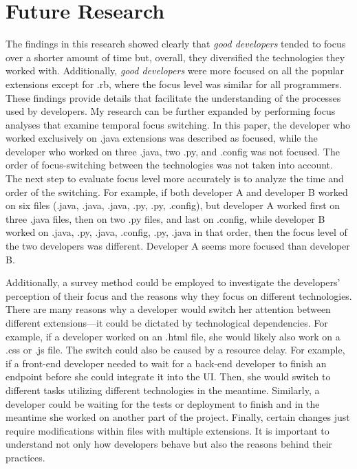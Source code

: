 
\chapter{Future Research}\label{chapter:future}

The findings in this research showed clearly that \textit{good developers }tended to focus over a shorter amount of time but, overall, they diversified the technologies they worked with. Additionally, \textit{good developers} were more focused on all the popular extensions except for .rb, where the focus level was similar for all programmers. These findings provide details that facilitate the understanding of the processes used by developers. My research can be further expanded by performing focus analyses that examine temporal focus switching. In this paper, the developer who worked exclusively on .java extensions was described as focused, while the developer who worked on three .java, two .py, and .config was not focused. The order of focus-switching between the technologies was not taken into account. The next step to evaluate focus level more accurately is to analyze the time and order of the switching. For example, if both developer A and developer B worked on six files (.java, .java, .java, .py, .py, .config), but developer A worked first on three .java files, then on two .py files, and last on .config, while developer B worked on .java, .py, .java, .config, .py, .java in that order, then the focus level of the two developers was different. Developer A seems more focused than developer B.\par

Additionally, a survey method could be employed to investigate the developers’ perception of their focus and the reasons why they focus on different technologies. There are many reasons why a developer would switch her attention between different extensions—it could be dictated by technological dependencies. For example, if a developer worked on an .html file, she would likely also work on a .css or .js file. The switch could also be caused by a resource delay. For example, if a front-end developer needed to wait for a back-end developer to finish an endpoint before she could integrate it into the UI. Then, she would switch to different tasks utilizing different technologies in the meantime. Similarly, a developer could be waiting for the tests or deployment to finish and in the meantime she worked on another part of the project. Finally, certain changes just require modifications within files with multiple extensions. It is important to understand not only how developers behave but also the reasons behind their practices. \par

